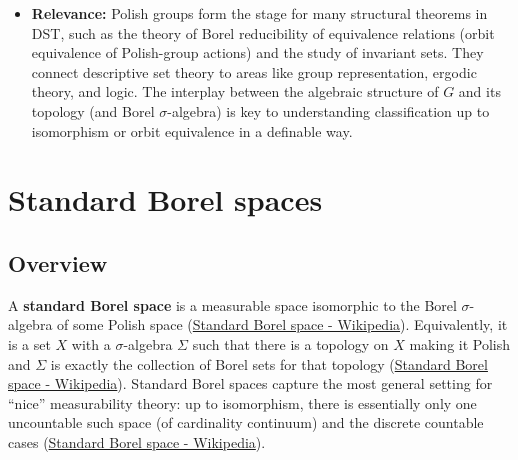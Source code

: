 \documentclass[11pt]{article}
\begin{document}
\begin{itemize}
\item \textbf{Relevance:} Polish groups form the stage for many structural theorems
in DST, such as the theory of Borel reducibility of equivalence
relations (orbit equivalence of Polish-group actions) and the study of
invariant sets. They connect descriptive set theory to areas like
group representation, ergodic theory, and logic. The interplay between
the algebraic structure of \(G\) and its topology (and Borel
\(\sigma\)-algebra) is key to understanding classification up to isomorphism or
orbit equivalence in a definable way.
\end{itemize}
\section{Standard Borel spaces}
\label{standard-borel-spaces}
\subsection{Overview}
\label{overview-1}
A \textbf{standard Borel space} is a measurable space isomorphic to the Borel
\(\sigma\)-algebra of some Polish space
(\href{https://en.wikipedia.org/wiki/Standard\_Borel\_space\#:\~:text=A\%20measurable\%20space\%20Image\%3A\%20,algebra.\%5B\%201}{Standard
Borel space - Wikipedia}). Equivalently, it is a set \(X\) with a
\(\sigma\)-algebra \(\Sigma\) such that there is a topology on \(X\) making it
Polish and \(\Sigma\) is exactly the collection of Borel sets for that
topology
(\href{https://en.wikipedia.org/wiki/Standard\_Borel\_space\#:\~:text=A\%20measurable\%20space\%20Image\%3A\%20,algebra.\%5B\%201}{Standard
Borel space - Wikipedia}). Standard Borel spaces capture the most
general setting for “nice” measurability theory: up to isomorphism,
there is essentially only one uncountable such space (of cardinality
continuum) and the discrete countable cases
(\href{https://en.wikipedia.org/wiki/Standard\_Borel\_space\#:\~:text=one\%20of\%20\%281\%29\%20Image\%3A\%20,is\%20reminiscent\%20of\%20Maharam\%27s\%20theorem}{Standard
Borel space - Wikipedia}).
\end{document}
